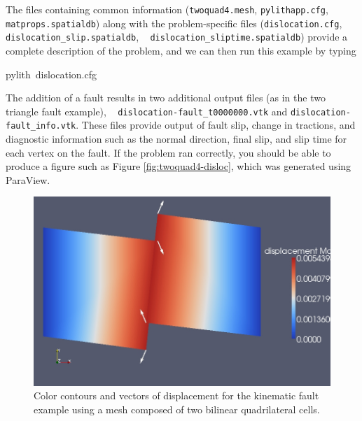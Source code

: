 The files containing common information (\texttt{twoquad4.mesh}, \texttt{pylithapp.cfg},
\texttt{matprops.spatialdb}) along with the problem-specific files
(\texttt{\small{}dislocation.cfg}{\small{}, }\texttt{\small{}dislocation\_slip.spatialdb}{\small{},
}\texttt{\small{}}~\linebreak{}
\texttt{\small{}dislocation\_sliptime.spatialdb}) provide a complete
description of the problem, and we can then run this example by typing
\begin{lyxcode}
pylith~dislocation.cfg
\end{lyxcode}
The addition of a fault results in two additional output files (as
in the two triangle fault example), \texttt{}~\linebreak{}
\texttt{dislocation-fault\_t0000000.vtk} and \texttt{dislocation-fault\_info.vtk}.
These files provide output of fault slip, change in tractions, and
diagnostic information such as the normal direction, final slip, and
slip time for each vertex on the fault. If the problem ran correctly,
you should be able to produce a figure such as Figure \vref{fig:twoquad4-disloc},
which was generated using ParaView.

\begin{figure}
\begin{centering}
\includegraphics[scale=0.33]{tutorials/twocells/figs/twoquad4-dislocation}
\par\end{centering}

\caption{Color contours and vectors of displacement for the kinematic fault
example using a mesh composed of two bilinear quadrilateral cells.\label{fig:twoquad4-disloc}}
\end{figure}



